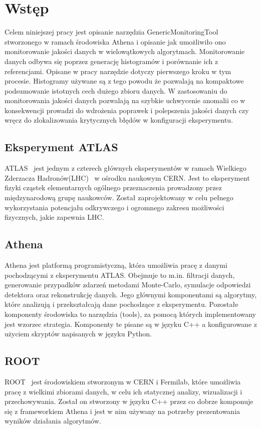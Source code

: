 \section{Wstęp}

Celem niniejszej pracy jest opisanie narzędzia \mbox{GenericMonitoringTool} stworzonego w ramach środowiska Athena\cite{Athena} i opisanie jak umożliwiło ono monitorowanie jakości danych w wielowątkowych algorytmach. Monitorowanie danych odbywa się poprzez generację histogramów i porównanie ich z referencjami. Opisane w pracy narzędzie dotyczy pierwszego kroku w tym procesie.
Histogramy używane są z tego powodu że pozwalają na kompaktowe podsumowanie istotnych cech dużego zbioru danych. 
W zastosowaniu do monitorowania jakości danych pozwalają na szybkie uchwycenie anomalii co w konsekwencji prowadzi do wdrożenia poprawek i polepszenia jakości danych czy wręcz do zlokalizowania krytycznych błędów w konfiguracji eksperymentu. 

\subsection{Eksperyment ATLAS}
ATLAS~\cite{} jest jednym z czterech głównych eksperymentów w ramach Wielkiego Zderzacza Hadronów(LHC)~\cite{} w ośrodku naukowym CERN. Jest to eksperyment fizyki cząstek elementarnych ogólnego przeznaczenia prowadzony przez międzynarodową grupę naukowców. Został zaprojektowany w celu pełnego wykorzystania potencjału odkrywczego i ogromnego zakresu możliwości fizycznych, jakie zapewnia LHC.

\subsection{Athena}
Athena jest platformą programistyczną, która umożliwia pracę z danymi pochodzącymi z eksperymentu ATLAS. Obejmuje to m.in. filtracji danych, generowanie przypadków zdarzeń metodami Monte-Carlo, symulacje odpowiedzi detektora oraz rekonstrukcję danych. Jego głównymi komponentami są algorytmy, które analizują i przekształcają dane pochodzące z eksperymentu. Pozostałe komponenty środowiska to narzędzia (tools), za pomocą których implementowany jest wzorzec strategia.  Komponenty te pisane są w języku C++ a konfigurowane z użyciem skryptów napisanych w języku Python. 

\subsection{ROOT}
ROOT~\cite{} jest środowiskiem stworzonym w CERN i Fermilab, które umożliwia pracę z wielkimi zbiorami danych, w celu ich statycznej analizy, wizualizacji i przechowywania. Został on stworzony w języku C++ przez co dobrze komponuje się z frameworkiem Athena i jest w nim używany na potrzeby prezentowania wyników działania algorytmów. 

